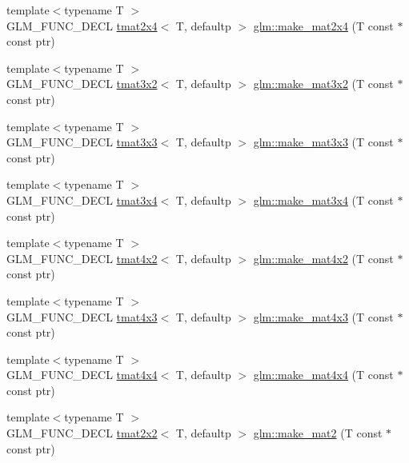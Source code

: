 \begin{DoxyCompactItemize}
\item 
{\footnotesize template$<$typename T $>$ }\\G\+L\+M\+\_\+\+F\+U\+N\+C\+\_\+\+D\+E\+CL \hyperlink{structglm_1_1tmat2x4}{tmat2x4}$<$ T, defaultp $>$ \hyperlink{group__gtc__type__ptr_ga6dfb2ac10859b0cc8e3893ea84fa95b5}{glm\+::make\+\_\+mat2x4} (T const $\ast$const ptr)
\item 
{\footnotesize template$<$typename T $>$ }\\G\+L\+M\+\_\+\+F\+U\+N\+C\+\_\+\+D\+E\+CL \hyperlink{structglm_1_1tmat3x2}{tmat3x2}$<$ T, defaultp $>$ \hyperlink{group__gtc__type__ptr_gabe1e5066608a66da7a94f802b57b4eed}{glm\+::make\+\_\+mat3x2} (T const $\ast$const ptr)
\item 
{\footnotesize template$<$typename T $>$ }\\G\+L\+M\+\_\+\+F\+U\+N\+C\+\_\+\+D\+E\+CL \hyperlink{structglm_1_1tmat3x3}{tmat3x3}$<$ T, defaultp $>$ \hyperlink{group__gtc__type__ptr_ga3cbe7adf857c867cee77eae4617abadd}{glm\+::make\+\_\+mat3x3} (T const $\ast$const ptr)
\item 
{\footnotesize template$<$typename T $>$ }\\G\+L\+M\+\_\+\+F\+U\+N\+C\+\_\+\+D\+E\+CL \hyperlink{structglm_1_1tmat3x4}{tmat3x4}$<$ T, defaultp $>$ \hyperlink{group__gtc__type__ptr_gac083edd180ab4d4b817acc60c516209b}{glm\+::make\+\_\+mat3x4} (T const $\ast$const ptr)
\item 
{\footnotesize template$<$typename T $>$ }\\G\+L\+M\+\_\+\+F\+U\+N\+C\+\_\+\+D\+E\+CL \hyperlink{structglm_1_1tmat4x2}{tmat4x2}$<$ T, defaultp $>$ \hyperlink{group__gtc__type__ptr_ga967a5b934e67ff9a6d1d0d27a377a264}{glm\+::make\+\_\+mat4x2} (T const $\ast$const ptr)
\item 
{\footnotesize template$<$typename T $>$ }\\G\+L\+M\+\_\+\+F\+U\+N\+C\+\_\+\+D\+E\+CL \hyperlink{structglm_1_1tmat4x3}{tmat4x3}$<$ T, defaultp $>$ \hyperlink{group__gtc__type__ptr_ga4d42daced532b33cc672280e48670a51}{glm\+::make\+\_\+mat4x3} (T const $\ast$const ptr)
\item 
{\footnotesize template$<$typename T $>$ }\\G\+L\+M\+\_\+\+F\+U\+N\+C\+\_\+\+D\+E\+CL \hyperlink{structglm_1_1tmat4x4}{tmat4x4}$<$ T, defaultp $>$ \hyperlink{group__gtc__type__ptr_gaf605a5f5e2ff594e8d404b2855b09541}{glm\+::make\+\_\+mat4x4} (T const $\ast$const ptr)
\item 
{\footnotesize template$<$typename T $>$ }\\G\+L\+M\+\_\+\+F\+U\+N\+C\+\_\+\+D\+E\+CL \hyperlink{structglm_1_1tmat2x2}{tmat2x2}$<$ T, defaultp $>$ \hyperlink{group__gtc__type__ptr_ga52a16e333fef7e33ca740779482a8693}{glm\+::make\+\_\+mat2} (T const $\ast$const ptr)

\end{DoxyCompactItemize}
